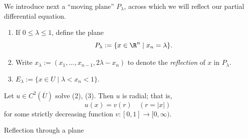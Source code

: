 We introduce next a ``moving plane'' $P_\lambda$, across which we will reflect our partial differential equation.

\begin{definition}
\label{def:moving-plane-notation}
\begin{enumerate}
\item[(i)] If $0 \le \lambda \le 1$, define the plane
\[
P_\lambda := \{x \in \R^n \mid x_n = \lambda\}.
\]
\item[(ii)] Write $x_\lambda := (x_1, \ldots, x_{n-1}, 2\lambda - x_n)$ to denote the \textit{reflection} of $x$ in $P_\lambda$.
\item[(iii)] $E_\lambda := \{x \in U \mid \lambda < x_n < 1\}$.
\end{enumerate}
\end{definition}

\begin{theorem}
\label{thm:radial-symmetry-positive-solutions}
Let $u \in C^2(\overline{U})$ solve (2), (3). Then $u$ is radial; that is,
\[
u(x) = v(r) \quad (r = |x|)
\]
for some strictly decreasing function $v : [0, 1] \to [0, \infty)$.
\end{theorem}

\begin{figure}[h]\centering
\end{figure}

Reflection through a plane

